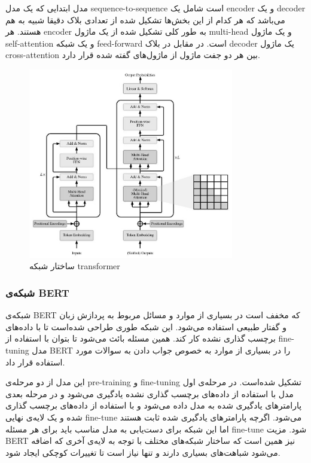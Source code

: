 \documentclass[12pt, a4paper, oneside]{report}
\begin{document}
مدل ابتدایی که یک مدل
sequence-to-sequence
است شامل یک
encoder
و یک
decoder
می‌باشد که هر کدام از این بخش‌ها تشکیل شده از تعدادی بلاک دقیقا شبیه به هم هستند. هر
encoder
به طور کلی تشکیل شده از یک ماژول
multi-head
و یک ماژول
self-attention
و یک شبکه 
feed-forward
است. در مقابل در بلاک
decoder
یک ماژول
cross-attention
بین هر دو جفت ماژول از ماژول‌های گفته شده قرار دارد.\cite{lin2021survey}

\begin{figure}[h]
    \centering
    \includegraphics[width=0.8\textwidth]{transformer}
    \caption{ ساختار شبکه transformer }
    \label{fig:transformer}
\end{figure}

\subsubsection{شبکه‌ی BERT}

شبکه‌ی
BERT
که مخفف
است در بسیاری از موارد و مسائل مربوط به پردازش زبان و گفتار طبیعی استفاده می‌شود.
این شبکه طوری طراحی شده‌است تا با داده‌های برچسب گذاری نشده کار کند. همین مسئله بائث می‌شود تا بتوان با استفاده از
fine-tuning
مدل
BERT
را در بسیاری از موارد به خصوص جواب دادن به سوالات مورد استفاده قرار داد. 

این مدل از دو مرحله‌ی
pre-training
و
fine-tuning
تشکیل شده‌است. در مرحله‌ی اول مدل با استفاده از داده‌های برچسب گذاری نشده یادگیری می‌شود و در مرحله بعدی پارامتر‌های
یادگیری شده به مدل داده می‌شود و با استفاده از داده‌های برچسب گذاری شده و یک لایه‌ی نهایی
fine-tune
می‌شود. اگرچه پارامتر‌های یادگیری شده ثابت هستند اما این شبکه برای دست‌یابی به مدل مناسب باید برای هر مسئله
fine-tune
شود. مزیت
BERT
نیز همین است که ساختار شبکه‌های مختلف با توجه به لایه‌ی آخری که اضافه می‌شود شباهت‌های بسیاری دارند و تنها نیاز است
تا تغییرات کوچکی ایجاد شود.
\end{document}
